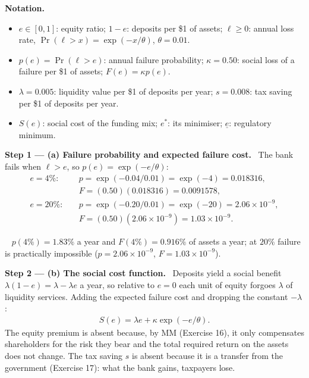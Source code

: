 \documentclass[11pt,a4paper]{article}
\numberwithin{equation}{section}
\newcommand{\notation}{\par\smallskip\noindent\textbf{Notation.}}
\newcommand{\step}[2]{\par\smallskip\noindent\textbf{Step #1 --- #2.}~}
\newcommand{\answer}[1]{\par\smallskip\noindent\fbox{\textbf{Answer #1.}}~}
\begin{document}
\notation
\begin{itemize}
  \item $e\in[0,1]$: equity ratio; $1-e$: deposits per \$1 of assets; $\ell\ge0$: annual loss rate, $\Pr(\ell>x)=\exp(-x/\theta)$, $\theta=0.01$.
  \item $p(e)=\Pr(\ell>e)$: annual failure probability; $\kappa=0.50$: social loss of a failure per \$1 of assets; $F(e)=\kappa p(e)$.
  \item $\lambda=0.005$: liquidity value per \$1 of deposits per year; $s=0.008$: tax saving per \$1 of deposits per year.
  \item $S(e)$: social cost of the funding mix; $e^*$: its minimiser; $\underline e$: regulatory minimum.
\end{itemize}

\step{1}{(a) Failure probability and expected failure cost} The bank fails when $\ell>e$, so
$p(e)=\exp(-e/\theta)$:
\begin{align}
  e=4\%:&\quad p=\exp(-0.04/0.01)=\exp(-4)=0.018316, \label{eq:18F}\\
        &\quad F=(0.50)(0.018316)=0.0091578, \nonumber\\
  e=20\%:&\quad p=\exp(-0.20/0.01)=\exp(-20)=2.06\times10^{-9}, \nonumber\\
        &\quad F=(0.50)(2.06\times10^{-9})=1.03\times10^{-9}. \nonumber
\end{align}
\answer{(a)} $p(4\%)=1.83\%$ a year and $F(4\%)=0.916\%$ of assets a year; at $20\%$ failure is
practically impossible ($p=2.06\times10^{-9}$, $F=1.03\times10^{-9}$).

\step{2}{(b) The social cost function} Deposits yield a social benefit $\lambda(1-e)=\lambda-\lambda e$
a year, so relative to $e=0$ each unit of equity forgoes $\lambda$ of liquidity services. Adding the
expected failure cost and dropping the constant $-\lambda$:
\begin{align}
  S(e)=\lambda e+\kappa\exp(-e/\theta). \label{eq:18S}
\end{align}
The equity premium is absent because, by MM (Exercise 16), it only compensates shareholders for the
risk they bear and the total required return on the assets does not change. The tax saving $s$ is
absent because it is a transfer from the government (Exercise 17): what the bank gains, taxpayers lose.
\end{document}
